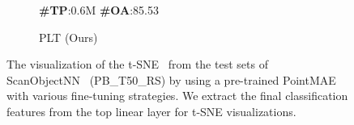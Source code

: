 \begin{figure}
\begin{subfigure}{0.24\textwidth}
        \caption*{\textbf{\#TP}:0.6M \textbf{\#OA}:85.53}
        \caption{PLT (Ours)}
        \label{fig:sub8}
    \end{subfigure}
    \caption{The visualization of the t-SNE~\cite{van2008visualizing} from the test sets of ScanObjectNN~\cite{uy2019revisiting} (PB\_T50\_RS) by using a pre-trained PointMAE~\cite{pang2022masked} with various fine-tuning strategies. We extract the final classification features from the top linear layer for t-SNE visualizations.}
    \label{fig:tsne}
\end{figure}